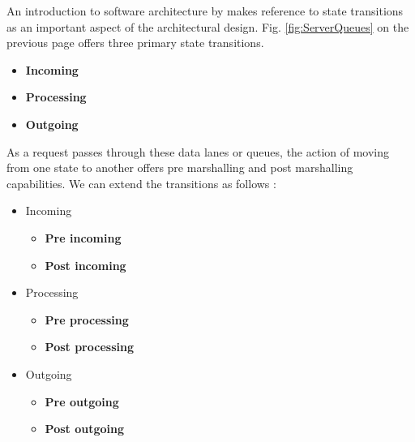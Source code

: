 		\normalsize
		{
			An introduction to software architecture by \citet{introsoftwarearchitecture} makes reference to state transitions 
			as an important aspect of the architectural design.  Fig. \ref{fig:ServerQueues} on the previous page
			offers three primary state transitions.  
			
			\vspace{-5mm}
			\begin{multicols}{3}
			
				\begin{itemize}[itemsep=1pt,parsep=1pt]
					\item \textbf{Incoming}				
					\item \textbf{Processing}		
					\item \textbf{Outgoing}	
				\end{itemize}	

			\end{multicols}		

			As a request passes through these data lanes or queues, the action of moving from one state to another
			offers pre marshalling and post marshalling capabilities.  We can extend the transitions as follows :
			
			\vspace{-2mm}
			\begin{multicols}{3}
			
				\begin{itemize}[itemsep=1pt,parsep=1pt]
				
					\item Incoming	
						\begin{itemize}
							\item \textbf{Pre incoming}				
							\item \textbf{Post incoming}	
						\end{itemize}
						
						
					\item Processing	
						\begin{itemize}
							\item \textbf{Pre processing}				
							\item \textbf{Post processing}	
						\end{itemize}
						
					\item Outgoing	
						\begin{itemize}
							\item \textbf{Pre outgoing}				
							\item \textbf{Post outgoing}	
						\end{itemize}
						

\end{itemize}
\end{multicols}}
